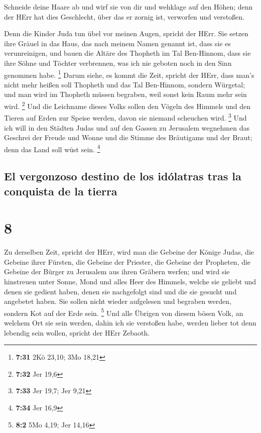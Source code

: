  Schneide deine Haare ab und wirf sie von dir und
wehklage auf den Höhen; denn der HErr hat dies Geschlecht, über das er
zornig ist, verworfen und verstoßen.

 Denn die Kinder Juda tun übel vor meinen Augen, spricht
der HErr. Sie setzen ihre Gräuel in das Haus, das nach meinem Namen
genannt ist, dass sie es verunreinigen,  und bauen die
Altäre des Thopheth im Tal Ben-Hinnom, dass sie ihre Söhne und Töchter
verbrennen, was ich nie geboten noch in den Sinn genommen habe.
\footnote{\textbf{7:31} 2Kö 23,10; 3Mo 18,21}  Darum
siehe, es kommt die Zeit, spricht der HErr, dass man's nicht mehr heißen
soll Thopheth und das Tal Ben-Hinnom, sondern Würgetal; und man wird im
Thopheth müssen begraben, weil sonst kein Raum mehr sein wird.
\footnote{\textbf{7:32} Jer 19,6}  Und die Leichname
dieses Volks sollen den Vögeln des Himmels und den Tieren auf Erden zur
Speise werden, davon sie niemand scheuchen wird. \footnote{\textbf{7:33}
  Jer 19,7; Jer 9,21}  Und ich will in den Städten Judas
und auf den Gassen zu Jerusalem wegnehmen das Geschrei der Freude und
Wonne und die Stimme des Bräutigams und der Braut; denn das Land soll
wüst sein. \footnote{\textbf{7:34} Jer 16,9}

\hypertarget{el-vergonzoso-destino-de-los-iduxf3latras-tras-la-conquista-de-la-tierra}{%
\subsection{El vergonzoso destino de los idólatras tras la conquista de
la
tierra}\label{el-vergonzoso-destino-de-los-iduxf3latras-tras-la-conquista-de-la-tierra}}

\hypertarget{section-7}{%
\section{8}\label{section-7}}

 Zu derselben Zeit, spricht der HErr, wird man die Gebeine
der Könige Judas, die Gebeine ihrer Fürsten, die Gebeine der Priester,
die Gebeine der Propheten, die Gebeine der Bürger zu Jerusalem aus ihren
Gräbern werfen;  und wird sie hinstreuen unter Sonne, Mond
und alles Heer des Himmels, welche sie geliebt und denen sie gedient
haben, denen sie nachgefolgt sind und die sie gesucht und angebetet
haben. Sie sollen nicht wieder aufgelesen und begraben werden, sondern
Kot auf der Erde sein. \footnote{\textbf{8:2} 5Mo 4,19; Jer 14,16}
 Und alle Übrigen von diesem bösen Volk, an welchem Ort
sie sein werden, dahin ich sie verstoßen habe, werden lieber tot denn
lebendig sein wollen, spricht der HErr Zebaoth.

